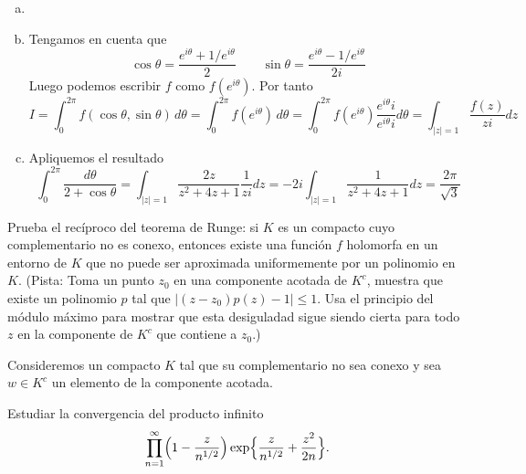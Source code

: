 \documentclass[twoside]{article}
\begin{document}
\begin{solucion}
\begin{enumerate}[a)]
\item[]
\item Tengamos en cuenta que 
$$\cos \theta = \frac{e^{i \theta}+1/e^{i\theta}}{2}
\qquad \sin \theta = \frac{e^{i \theta}-1/e^{i\theta}}{2i}$$ 
Luego podemos escribir $f$ como $f(e^{i\theta})$. Por tanto
$$
I = \int_0^{2\pi} f(\cos\theta,\sin\theta)\,d\theta = \int_0^{2\pi} f(e^{i\theta})\,d\theta = \int_0^{2\pi} f(e^{i\theta})\frac{e^{i\theta}i}{e^{i\theta}i} d\theta = \int_{|z|=1} \frac{f(z)}{zi}dz
$$
\item Apliquemos el resultado
$$
\int_0^{2\pi}\frac{d\theta}{2+\cos\theta} = \int_{|z|=1}\frac{2z}{z^2+4z+1}\frac{1}{zi} dz= -2i\int_{|z|=1}\frac{1}{z^2+4z+1} dz = \frac{2\pi}{\sqrt{3}}
$$
\end{enumerate}
\end{solucion}
\newpage
\begin{ejercicio}{9}
Prueba el recíproco del teorema de Runge: si $K$ es un compacto cuyo complementario no es conexo, entonces existe una función $f$ holomorfa en un entorno de $K$ que no puede ser aproximada uniformemente por un polinomio en $K$. (Pista: Toma un punto $z_0$ en una componente acotada de $K^c$, muestra que existe un polinomio $p$ tal que $|(z-z_0)p(z)-1|\leq 1$. Usa el principio del módulo máximo para mostrar que esta desiguladad sigue siendo cierta para todo $z$ en la componente de $K^c$ que contiene a $z_0$.)
\end{ejercicio}
\begin{solucion}
Consideremos un compacto $K$ tal que su complementario no sea conexo y sea $w \in K^c$ un elemento de la componente acotada.
\end{solucion}
\newpage
\begin{ejercicio}{10}
Estudiar la convergencia del producto infinito
\[\prod_{n=1}^\infty \Bigl(1-\frac{z}{n^{1/2}}\Bigr)\exp\Bigl\{\frac{z}{n^{1/2}}+\frac{z^2}{2n}\Bigr\}.\]
\end{ejercicio}
\end{document}
